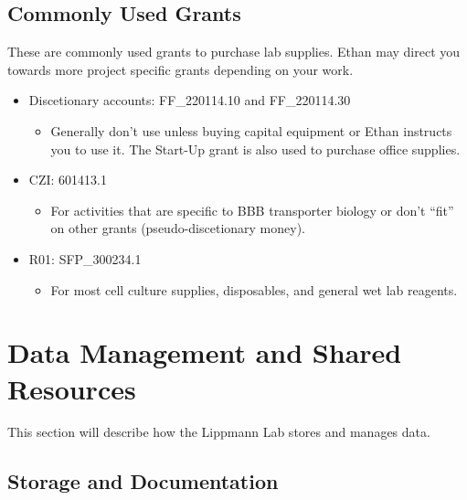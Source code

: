 \documentclass[
]{book}
\providecommand{\tightlist}{%
  \setlength{\itemsep}{0pt}\setlength{\parskip}{0pt}}
\begin{document}
\hypertarget{commonly-used-grants}{%
\section{Commonly Used Grants}\label{commonly-used-grants}}

These are commonly used grants to purchase lab supplies. Ethan may direct you towards more project specific grants depending on your work.

\begin{itemize}
\tightlist
\item
  Discetionary accounts: FF\_220114.10 and FF\_220114.30

  \begin{itemize}
  \tightlist
  \item
    Generally don't use unless buying capital equipment or Ethan instructs you to use it. The Start-Up grant is also used to purchase office supplies.
  \end{itemize}
\item
  CZI: 601413.1

  \begin{itemize}
  \tightlist
  \item
    For activities that are specific to BBB transporter biology or don't ``fit'' on other grants (pseudo-discetionary money).
  \end{itemize}
\item
  R01: SFP\_300234.1

  \begin{itemize}
  \tightlist
  \item
    For most cell culture supplies, disposables, and general wet lab reagents.
  \end{itemize}
\end{itemize}

\hypertarget{datamanagement}{%
\chapter{Data Management and Shared Resources}\label{datamanagement}}

This section will describe how the Lippmann Lab stores and manages data.

\hypertarget{storage-and-documentation}{%
\section{Storage and Documentation}\label{storage-and-documentation}}
\end{document}
